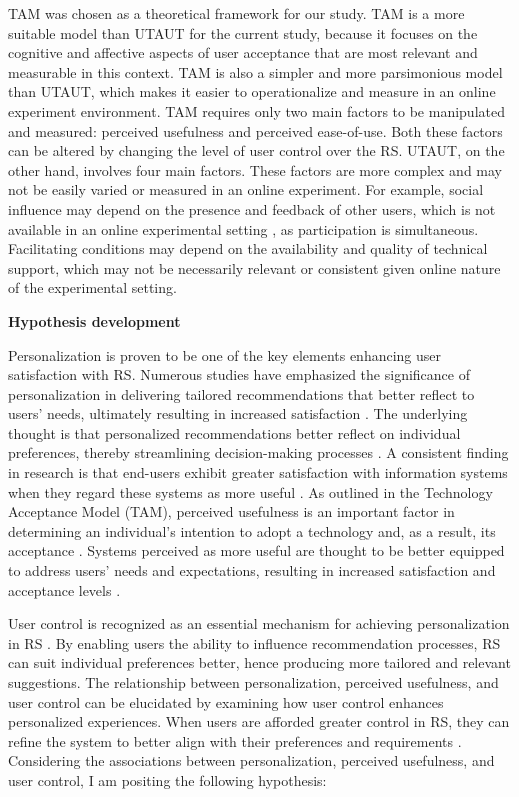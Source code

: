 \documentclass[a4paper,12pt]{article}
\begin{document}
TAM was chosen as a theoretical framework for our study. TAM is a more suitable model than UTAUT for the current study, because it focuses on the cognitive and affective aspects of user acceptance that are most relevant and measurable in this context. TAM is also a simpler and more parsimonious model than UTAUT, which makes it easier to operationalize and measure in an online experiment environment. TAM requires only two main factors to be manipulated and measured: perceived usefulness and perceived ease-of-use. Both these factors can be altered by changing the level of user control over the RS. UTAUT, on the other hand, involves four main factors. These factors are more complex and may not be easily varied or measured in an online experiment. For example, social influence may depend on the presence and feedback of other users, which is not available in an online experimental setting , as participation is simultaneous. Facilitating conditions may depend on the availability and quality of technical support, which may not be necessarily relevant or consistent given online nature of the experimental setting.

\textbf{Hypothesis development}

Personalization is proven to be one of the key elements enhancing user satisfaction with RS. Numerous studies have emphasized the significance of personalization in delivering tailored recommendations that better reflect to users' needs, ultimately resulting in increased satisfaction \citep{bostandjiev2012tasteweights, hijikata2012relation, knijnenburgExplainingUserExperience2012, songWhenHowDiversify2019}. The underlying thought is that personalized recommendations better reflect on individual preferences, thereby streamlining decision-making processes \citep{adomavicius2005toward}. A consistent finding in research is that end-users exhibit greater satisfaction with information systems when they regard these systems as more useful \citep{mahmood2000variables, venkatesh2003utaut}. As outlined in the Technology Acceptance Model (TAM), perceived usefulness is an important factor in determining an individual's intention to adopt a technology and, as a result, its acceptance \citep{davis1985technology}. Systems perceived as more useful are thought to be better equipped to address users' needs and expectations, resulting in increased satisfaction and acceptance levels \citep{venkateshTechnologyAcceptanceModel2008}.

User control is recognized as an essential mechanism for achieving personalization in RS \citep{jannach2017user}. By enabling users the ability to influence recommendation processes, RS can suit individual preferences better, hence producing more tailored and relevant suggestions. The relationship between personalization, perceived usefulness, and user control can be elucidated by examining how user control enhances personalized experiences. When users are afforded greater control in RS, they can refine the system to better align with their preferences and requirements \citep{chen2014designing}. Considering the associations between personalization, perceived usefulness, and user control, I am positing the following hypothesis:
\end{document}
